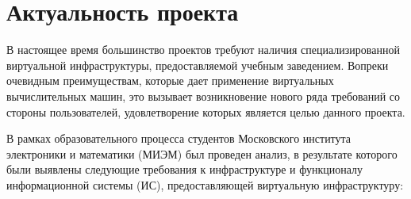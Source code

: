 \documentclass[14pt, a4paper]{extarticle}
\begin{document}

\tableofcontents

\pagebreak


\section{Актуальность проекта}

В настоящее время большинство проектов требуют наличия специализированной виртуальной инфраструктуры, предоставляемой учебным заведением. Вопреки очевидным преимуществам, которые дает применение виртуальных вычислительных машин, это вызывает возникновение нового ряда требований со стороны пользователей, удовлетворение которых является целью данного проекта.

В рамках образовательного процесса студентов Московского института электроники и математики (МИЭМ) был проведен анализ, в результате которого были выявлены следующие требования к инфраструктуре и функционалу информационной системы (ИС), предоставляющей виртуальную инфраструктуру:
\end{document}
